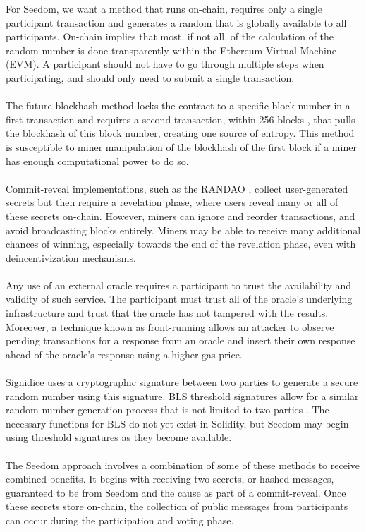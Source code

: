 \documentclass[11pt]{article}
\begin{document}
For Seedom, we want a method that runs on-chain, requires only a single participant transaction and generates a random that is globally available to all participants. On-chain implies that most, if not all, of the calculation of the random number is done transparently within the Ethereum Virtual Machine (EVM). A participant should not have to go through multiple steps when participating, and should only need to submit a single transaction.\\\\
The future blockhash method locks the contract to a specific block number in a first transaction and requires a second transaction, within 256 blocks \cite{14}, that pulls the blockhash of this block number, creating one source of entropy. This method is susceptible to miner manipulation of the blockhash of the first block if a miner has enough computational power to do so.\\\\
Commit-reveal implementations, such as the RANDAO \cite{2}, collect user-generated secrets but then require a revelation phase, where users reveal many or all of these secrets on-chain. However, miners can ignore and reorder transactions, and avoid broadcasting blocks entirely. Miners may be able to receive many additional chances of winning, especially towards the end of the revelation phase, even with deincentivization mechanisms.\\\\
Any use of an external oracle requires a participant to trust the availability and validity of such service. The participant must trust all of the oracle's underlying infrastructure and trust that the oracle has not tampered with the results. Moreover, a technique known as front-running allows an attacker to observe pending transactions for a response from an oracle and insert their own response ahead of the oracle's response using a higher gas price.\\\\
Signidice uses a cryptographic signature between two parties to generate a secure random number using this signature. BLS threshold signatures allow for a similar random number generation process that is not limited to two parties \cite{15}. The necessary functions for BLS do not yet exist in Solidity, but Seedom may begin using threshold signatures as they become available.\\\\
The Seedom approach involves a combination of some of these methods to receive combined benefits. It begins with receiving two secrets, or hashed messages, guaranteed to be from Seedom and the cause as part of a commit-reveal. Once these secrets store on-chain, the collection of public messages from participants can occur during the participation and voting phase.\\\\
\end{document}
